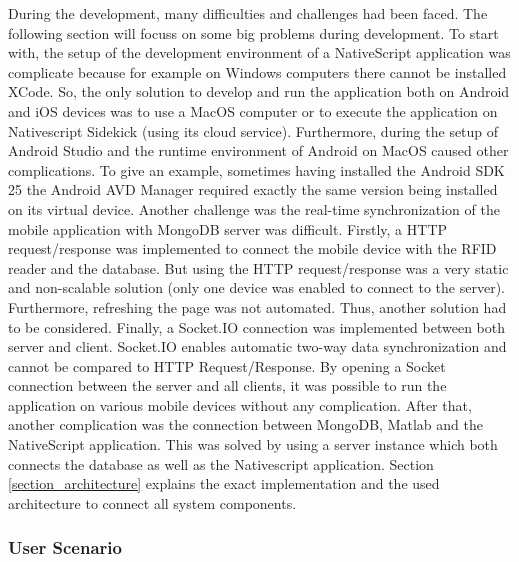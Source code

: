 During the development, many difficulties and challenges had been faced. The following section will focuss on some big problems during development.
To start with, the setup of the development environment of a NativeScript application was complicate because for example on Windows computers there cannot be installed XCode. So, the only solution to develop and run the application both on Android and iOS devices was to use a MacOS computer or to execute the application on Nativescript Sidekick (using its cloud service). Furthermore, during the setup of Android Studio and the runtime environment of Android on MacOS caused other complications. To give an example, sometimes having installed the Android \ac{SDK} 25 the Android \ac{AVD} Manager required exactly the same version being installed on its virtual device. 
Another challenge was the real-time synchronization of the mobile application with MongoDB server was difficult. Firstly, a HTTP request/response was implemented to connect the mobile device with the RFID reader and the database. But using the HTTP request/response was a very static and non-scalable solution (only one device was enabled to connect to the server). Furthermore, refreshing the page was not automated. Thus, another solution had to be considered. Finally, a Socket.IO connection was implemented between both server and client. Socket.IO enables automatic two-way data synchronization and cannot be compared to HTTP Request/Response. By opening a Socket connection between the server and all clients, it was possible to run the application on various mobile devices without any complication. 
After that, another complication was the connection between MongoDB, Matlab and the NativeScript application. This was solved by using a server instance which both connects the database as well as the Nativescript application. Section \ref{section_architecture} explains the exact implementation and the used architecture to connect all system components. 

\subsubsection{User Scenario}

